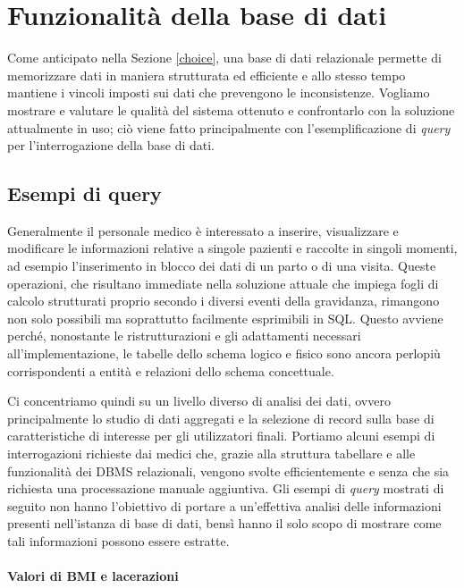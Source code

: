 \chapter{Funzionalità della base di dati}
\label{functionality}

Come anticipato nella Sezione \ref{choice}, una base di dati relazionale permette di memorizzare dati in maniera strutturata ed efficiente e allo stesso tempo mantiene i vincoli imposti sui dati che prevengono le inconsistenze.
Vogliamo mostrare e valutare le qualità del sistema ottenuto e confrontarlo con la soluzione attualmente in uso; ciò viene fatto principalmente con l'esemplificazione di \emph{query} per l'interrogazione della base di dati.

\section{Esempi di query} %

Generalmente il personale medico è interessato a inserire, visualizzare e modificare le informazioni relative a singole pazienti e raccolte in singoli momenti, ad esempio l'inserimento in blocco dei dati di un parto o di una visita.
Queste operazioni, che risultano immediate nella soluzione attuale che impiega fogli di calcolo strutturati proprio secondo i diversi eventi della gravidanza, rimangono non solo possibili ma soprattutto facilmente esprimibili in SQL.
Questo avviene perché, nonostante le ristrutturazioni e gli adattamenti necessari all'implementazione, le tabelle dello schema logico e fisico sono ancora perlopiù corrispondenti a entità e relazioni dello schema concettuale.

Ci concentriamo quindi su un livello diverso di analisi dei dati, ovvero principalmente lo studio di dati aggregati e la selezione di record sulla base di caratteristiche di interesse per gli utilizzatori finali.
Portiamo alcuni esempi di interrogazioni richieste dai medici che, grazie alla struttura tabellare e alle funzionalità dei DBMS relazionali, vengono svolte efficientemente e senza che sia richiesta una processazione manuale aggiuntiva.
Gli esempi di \emph{query} mostrati di seguito non hanno l'obiettivo di portare a un'effettiva analisi delle informazioni presenti nell'istanza di base di dati, bensì hanno il solo scopo di mostrare come tali informazioni possono essere estratte.

\subsubsection{Valori di BMI e lacerazioni}

